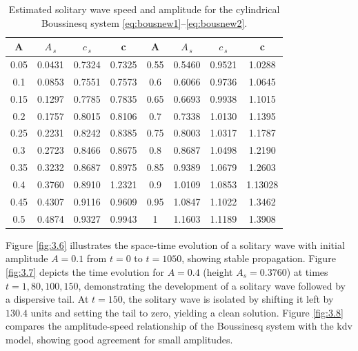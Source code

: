 \documentclass[alpha-refs, 12pt]{wiley-article}
\begin{document}
\begin{table}
  \caption{\label{tab2.2} Estimated solitary wave speed and amplitude for the cylindrical Boussinesq system \eqref{eq:bousnew1}--\eqref{eq:bousnew2}.}
  \begin{center}
  \begin{tabular}{ |c       c       c       c | c       c       c       c | }
   \hline
    A & $A_{\,s}$ & $c_{\,s}$ & c& A & $A_{\,s}$ & $c_{\,s}$ & c\\
    \hline
   0.05 & 0.0431 & 0.7324 & 0.7325& 0.55 & 0.5460 & 0.9521 & 1.0288 \\
   \hline
   0.1 & 0.0853 & 0.7551& 0.7573 & 0.6 &  0.6066 & 0.9736 & 1.0645\\
   \hline
   0.15 &  0.1297 & 0.7785 & 0.7835 & 0.65 & 0.6693 & 0.9938 & 1.1015\\
   \hline
   0.2 & 0.1757 & 0.8015 & 0.8106 & 0.7 &   0.7338 & 1.0130 & 1.1395\\
   \hline
   0.25 & 0.2231 & 0.8242 & 0.8385& 0.75 & 0.8003 & 1.0317 & 1.1787 \\
    \hline
   0.3 & 0.2723 & 0.8466 & 0.8675 & 0.8 & 0.8687 & 1.0498 & 1.2190\\
   \hline
   0.35 & 0.3232 & 0.8687 & 0.8975 & 0.85 & 0.9389  & 1.0679 & 1.2603 \\
    \hline
   0.4 &  0.3760 & 0.8910 & 1.2321 & 0.9 & 1.0109 & 1.0853 &1.13028\\
    \hline
    0.45 & 0.4307  & 0.9116 & 0.9609 & 0.95 & 1.0847&1.1022 & 1.3462  \\
    \hline
    0.5 &   0.4874 & 0.9327 & 0.9943 & 1 & 1.1603 & 1.1189 & 1.3908\\
   \hline
  \end{tabular}
  \end{center}
\end{table}

Figure \ref{fig:3.6} illustrates the space-time evolution of a solitary wave with initial amplitude $A = 0.1$ from $t = 0$ to $t = 1050$, showing stable propagation. Figure \ref{fig:3.7} depicts the time evolution for $A = 0.4$ (height $A_s = 0.3760$) at times $t = 1, 80, 100, 150$, demonstrating the development of a solitary wave followed by a dispersive tail. At $t = 150$, the solitary wave is isolated by shifting it left by $130.4$ units and setting the tail to zero, yielding a clean solution. Figure \ref{fig:3.8} compares the amplitude-speed relationship of the Boussinesq system with the \acrshort{kdv} model, showing good agreement for small amplitudes.
\end{document}
